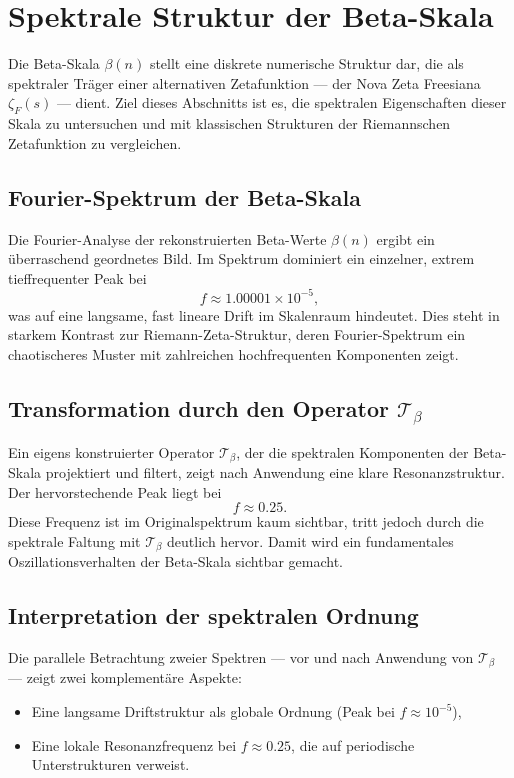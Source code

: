 \section{Spektrale Struktur der Beta-Skala}

Die Beta-Skala $\beta(n)$ stellt eine diskrete numerische Struktur dar, die als spektraler Träger einer alternativen Zetafunktion --- der Nova Zeta Freesiana $\zeta_F(s)$ --- dient. Ziel dieses Abschnitts ist es, die spektralen Eigenschaften dieser Skala zu untersuchen und mit klassischen Strukturen der Riemannschen Zetafunktion zu vergleichen.

\subsection{Fourier-Spektrum der Beta-Skala}

Die Fourier-Analyse der rekonstruierten Beta-Werte $\beta(n)$ ergibt ein überraschend geordnetes Bild. Im Spektrum dominiert ein einzelner, extrem tieffrequenter Peak bei
\[
f \approx 1.00001 \times 10^{-5},
\]
was auf eine langsame, fast lineare Drift im Skalenraum hindeutet. Dies steht in starkem Kontrast zur Riemann-Zeta-Struktur, deren Fourier-Spektrum ein chaotischeres Muster mit zahlreichen hochfrequenten Komponenten zeigt.

\subsection{Transformation durch den Operator $\mathcal{T}_\beta$}

Ein eigens konstruierter Operator $\mathcal{T}_\beta$, der die spektralen Komponenten der Beta-Skala projektiert und filtert, zeigt nach Anwendung eine klare Resonanzstruktur. Der hervorstechende Peak liegt bei
\[
f \approx 0.25.
\]
Diese Frequenz ist im Originalspektrum kaum sichtbar, tritt jedoch durch die spektrale Faltung mit $\mathcal{T}_\beta$ deutlich hervor. Damit wird ein fundamentales Oszillationsverhalten der Beta-Skala sichtbar gemacht.

\subsection{Interpretation der spektralen Ordnung}

Die parallele Betrachtung zweier Spektren --- vor und nach Anwendung von $\mathcal{T}_\beta$ --- zeigt zwei komplementäre Aspekte:
\begin{itemize}
  \item Eine langsame Driftstruktur als globale Ordnung (Peak bei $f \approx 10^{-5}$),
  \item Eine lokale Resonanzfrequenz bei $f \approx 0.25$, die auf periodische Unterstrukturen verweist.
\end{itemize}

